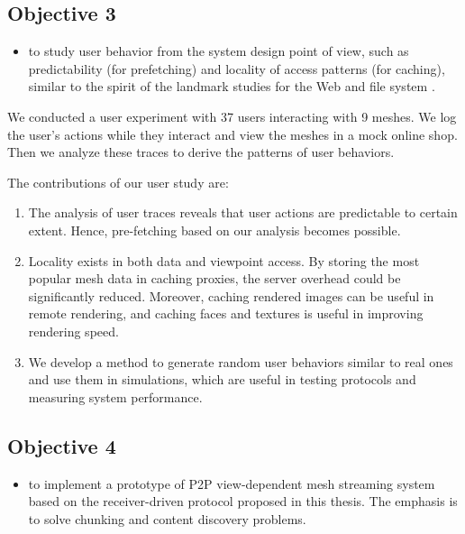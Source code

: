 \documentclass[11pt, a4paper]{report}
\begin{document}
    \subsection{Objective 3}
    \begin{itemize}
        \item
            to study user behavior from 
            the system design point of view, such as predictability (for prefetching)
            and locality of access patterns (for caching), similar to the spirit
            of the landmark studies for the Web \cite{huberman98web} and file system
            \cite {ousterhout85trace}. 
    \end{itemize}

We conducted a user experiment with 37 users interacting with 9 meshes.
We log the user's actions while they interact and view the meshes in a mock online shop.
Then we analyze these traces to derive the patterns of user behaviors.

The contributions of our user study are:
\begin{enumerate}
    \item
        The analysis of user traces reveals that 
        user actions are predictable to certain extent. 
        Hence, pre-fetching based on our analysis becomes possible.
    \item
        Locality exists in both data and viewpoint access. By
        storing the most popular mesh data in caching proxies, 
        the server overhead could be significantly reduced. 
        Moreover, caching rendered images can be useful in remote rendering,
        and caching faces and textures is useful in improving rendering speed.
    \item
        We develop a method to generate random user behaviors similar to real ones
        and use them in simulations, 
        which are useful in testing protocols and measuring system performance.
\end{enumerate}

    \subsection{Objective 4}
    \begin{itemize}
        \item
            to implement a prototype of P2P view-dependent mesh streaming system
            based on the receiver-driven protocol proposed in this thesis.
            The emphasis is to solve chunking and content discovery problems. 
    \end{itemize}
    
\end{document}
